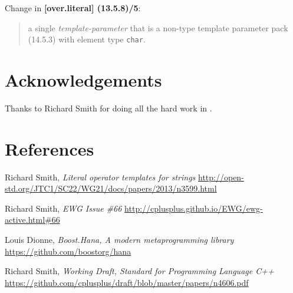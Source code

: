 \documentclass{wg21}
\begin{document}
Change in \textbf{[over.literal] (13.5.8)/5}:

\begin{quote}
    a single
  \textit{template-parameter} that is a non-type template parameter pack (14.5.3)
  with element type \texttt{char}. 
\end{quote}


\section{Acknowledgements}
Thanks to Richard Smith for doing all the hard work in \cite{N3599}.


\section{References}
\renewcommand{\section}[2]{}%
\begin{thebibliography}{9}

    Richard Smith,
    \emph{Literal operator templates for strings}\newline
    \url{http://open-std.org/JTC1/SC22/WG21/docs/papers/2013/n3599.html}

    Richard Smith,
    \emph{EWG Issue \#66}\newline
    \url{http://cplusplus.github.io/EWG/ewg-active.html#66}

    Louis Dionne,
    \emph{Boost.Hana, A modern metaprogramming library}\newline
    \url{https://github.com/boostorg/hana}

    Richard Smith,
    \emph{Working Draft, Standard for Programming Language C++}\newline
    \url{https://github.com/cplusplus/draft/blob/master/papers/n4606.pdf}

\end{thebibliography}
\end{document}
